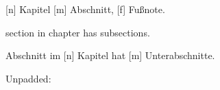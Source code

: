 \documentclass{report}
\newcounter{test} \setcounter{test}{29}
\begin{document}
[n] Kapitel [m]
Abschnitt, [f] Fußnote.

 section in 
chapter has  subsections.
  \par   {}%
 Abschnitt im [n]
Kapitel hat [m] Unterabschnitte.

\padzeroes[4]
    \par
Unpadded: \padzeroes[0]
   
\end{document}
